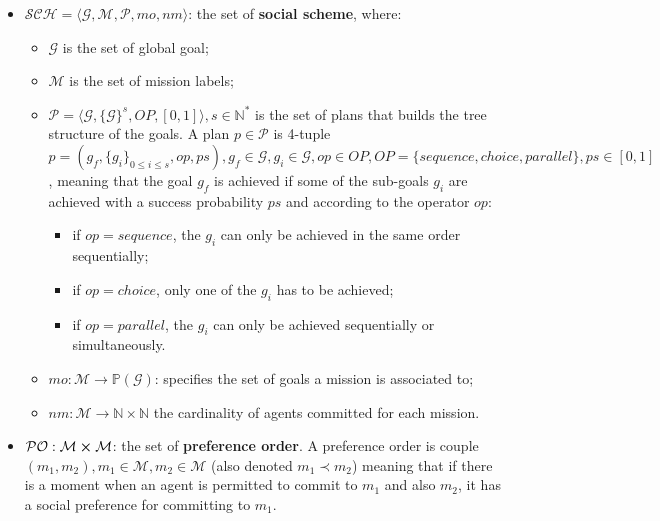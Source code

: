 \documentclass{ecai}
\begin{document}
\begin{itemize}
    \item $\mathcal{SCH} = \langle\mathcal{G}, \mathcal{M}, \mathcal{P}, mo, nm \rangle$: the set of \textbf{social scheme}, where:
          \begin{itemize}
              \item $\mathcal{G}$ is the set of global goal;

              \item $\mathcal{M}$ is the set of mission labels;
              \item $\mathcal{P} = \langle \mathcal{G}, \{\mathcal{G}\}^s, OP, [0,1] \rangle, s \in \mathbb{N}^*$ is the set of plans that builds the tree structure of the goals.
                    A plan $p \in \mathcal{P}$ is 4-tuple $p=(g_f,\{g_i\}_{0 \leq i \leq s}, op, ps), g_f \in \mathcal{G}, g_i \in \mathcal{G}, op \in OP, OP = \{sequence, choice, parallel\}, ps \in [0,1]$, meaning that the goal $g_f$ is achieved if some of the sub-goals $g_i$ are achieved with a success probability $ps$ and according to the operator $op$:
                    \begin{itemize}
                        \item if $op = sequence$, the $g_i$ can only be achieved in the same order sequentially;
                        \item if $op = choice$, only one of the $g_i$ has to be achieved;
                        \item if $op = parallel$, the $g_i$ can only be achieved sequentially or simultaneously.
                    \end{itemize}

              \item $mo: \mathcal{M} \rightarrow \mathbb{P}(\mathcal{G})$: specifies the set of goals a mission is associated to;
              \item $nm: \mathcal{M} \rightarrow \mathbb{N} \times \mathbb{N}$ the cardinality of agents committed for each mission.
          \end{itemize}
    \item $\mathcal{PO}: \mathcal{M} \cross \mathcal{M}$: the set of \textbf{preference order}. A preference order is couple $(m_1, m_2), m_1 \in \mathcal{M}, m_2 \in \mathcal{M}$ (also denoted $m_{1} \prec m_{2}$) meaning that if there is a moment when an agent is permitted to commit to $m_{1}$ and also $m_{2}$, it has a social preference for committing to $m_{1}$.
\end{itemize}
\end{document}
